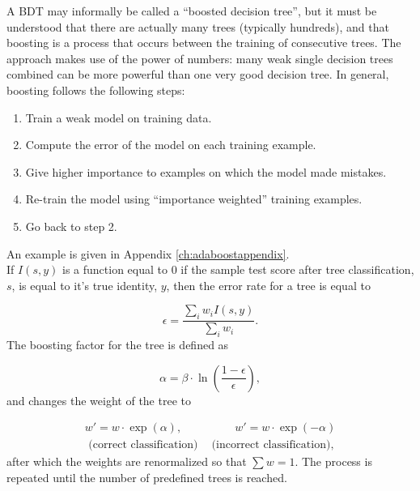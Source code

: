A BDT may informally be called a ``boosted decision tree'', but it must be understood that there are actually many trees (typically hundreds), and that boosting is a process that occurs between the training of consecutive trees. The approach makes use of the power of numbers: many weak single decision trees combined can be more powerful than one very good decision tree. In general, boosting follows the following steps:

\begin{enumerate}
\item Train a weak model on training data.
\item Compute the error of the model on each training example.
\item Give higher importance to examples on which the model made mistakes.
\item Re-train the model using ``importance weighted'' training examples.
\item Go back to step 2.
\end{enumerate}
\vspace{2mm}
An example is given in Appendix \ref{ch:adaboostappendix}.\\
\newline
\noindent If $I(s,y)$ is a function equal to 0 if the sample test score after tree classification, $s$, is equal to it's true identity, $y$, then the error rate for a tree is equal to

\begin{equation}
\epsilon = \frac{\sum_i w_i I(s,y)}{\sum_i w_i}.
\end{equation}
\noindent The boosting factor for the tree is defined as

\begin{equation}
\label{eq:boostfactor}
\alpha = \beta \cdot \ln\left(\frac{1-\epsilon}{\epsilon}\right),
\end{equation}
\noindent and changes the weight of the tree to

\begin{equation}
\begin{split}
w' = w \cdot \exp(\alpha), \ \ \ \ \ \ \ \ \ \ \ \ \ \ \ \ \ \ \ \ \ w' = w \cdot \exp(-\alpha)\\
\textrm{ (correct classification)} \ \ \ \ \textrm{ (incorrect classification),}
\end{split}
\end{equation}
\noindent after which the weights are renormalized so that $\sum w = 1$. The process is repeated until the number of predefined trees is reached.

